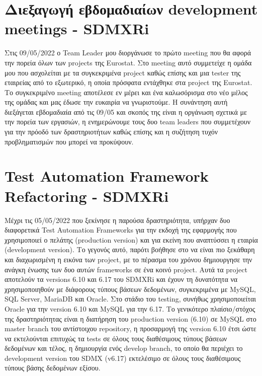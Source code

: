 \section*{Διεξαγωγή εβδομαδιαίων development meetings - SDMXRi}
Στις 09/05/2022 ο Team Leader μου διοργάνωσε το πρώτο meeting που θα αφορά την πορεία όλων των projects της Eurostat. Στο meeting αυτό συμμετείχε η ομάδα 
μου που ασχολείται με τα συγκεκριμένα project καθώς επίσης και μια tester της εταιρείας από το εξωτερικό, η οποία πρόσφατα εντάχθηκε στα project της Eurostat. 
Το συγκεκριμένο meeting αποτέλεσε εν μέρει και ένα καλωσόρισμα στο νέο μέλος της ομάδας και μας έδωσε την ευκαιρία να γνωριστούμε. Η συνάντηση αυτή διεξάγεται 
εβδομαδιαία από τις 09/05 και σκοπός της είναι η οργάνωση σχετικά με την πορεία των εργασιών, η ενημερώνουμε τους δυο team leaders που συμμετέχουν για την πρόοδό 
των δραστηριοτήτων καθώς επίσης και η συζήτηση τυχόν προβληματισμών που μπορεί να προκύψουν.

\section*{Test Automation Framework Refactoring - SDMXRi}
Μέχρι τις 05/05/2022 που ξεκίνησε η παρούσα δραστηριότητα, υπήρχαν δυο διαφορετικά Test Automation Frameworks για την εκδοχή της εφαρμογής που χρησιμοποιεί ο πελάτης (production version) και για εκείνη που 
αναπτύσσει η εταιρία (development version). Το γεγονός αυτό, παρότι βοήθησε στο να είναι πιο ξεκάθαρη και διαχωρισμένη η εικόνα των project, με το 
πέρασμα του χρόνου δημιουργησε την ανάγκη ένωσης των δυο αυτών frameworks σε ένα κοινό project. Αυτά τα project αποτελούν τα versions 6.10 και 6.17 του SDMXRi 
και έχουν τη δυνατότητα να χρησιμοποιηθούν με διάφορους τύπους βάσεων δεδομένων, συγκεκριμένα με MySQL, SQL Server, MariaDB και Oracle. Στο στάδιο του testing, 
συνήθως χρησιμοποιείται Oracle για την version 6.10 και MySQL για την 6.17. Το γενικότερο πλαίσιο/στόχος της δραστηριότητας είναι η διατήρηση του production 
version (6.10) σε MySQL στο master branch του αντίστοιχου repository, η προσαρμογή της version 6.10 έτσι ώστε να εκτελούνται επιτυχώς τα tests σε όλους τους διαθέσιμους τύπους βάσεων δεδομένων και 
τέλος, η δημιουργία ενός develop branch, το οποίο θα περιέχει το development version του SDMX (v6.17) εκτελέσιμο σε όλους τους διαθέσιμους τύπους βάσης δεδομένων εξίσου. \\

